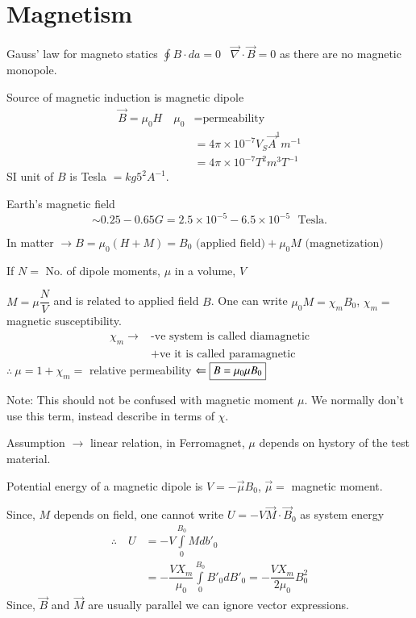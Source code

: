 \section*{Magnetism}

Gauss' law for magneto statics $\oint B\cdot da=0$ \ $\overrightarrow{\nabla}\cdot \overrightarrow{B}=0$ as there are no magnetic monopole.

Source of magnetic induction is magnetic dipole
\begin{align*}
\overrightarrow{B}=\mu_{0}H\quad \mu_{0} &= \text{permeability}\\
&= 4\pi \times 10^{-7}V_{S}\overrightarrow{A}^{1}m^{-1}\\
&= 4\pi \times 10^{-7}T^{2}m^{3}T^{-1}
\end{align*}
SI unit of $B$ is Tesla $=kg5^{2}A^{-1}$.

Earth's magnetic field
$$
\sim 0.25-0.65 G= 2.5\times 10^{-5}-6.5\times 10^{-5}\text{~ Tesla.}
$$

In matter $\to B=\mu_{0}(H+M)=B_{0}\text{ (applied field)} + \mu_{0}M\text{ (magnetization)}$

If $N=$ No. of dipole moments, $\mu$ in a volume, $V$ 

$M=\mu\dfrac{N}{V}$ and is related to applied field $B$. One can write $\mu_{0}M=\chi_{m}B_{0}$, $\chi_{m}=$ magnetic susceptibility.
\begin{align*}
\chi_{m} \to & \text{-ve system is called diamagnetic}\\
            & \text{+ve it is called paramagnetic}
\end{align*}
$\therefore \ \mu=1+\chi_{m}=$ relative permeability $\Leftarrow \fbox{$B=\mu_{0}\mu B_{0}$}$

Note: This should not be confused with magnetic moment $\mu$. We normally don't use this term, instead describe in terms of $\chi$.

Assumption $\to$ linear relation, in Ferromagnet, $\mu$ depends on hystory of the test material.

Potential energy of a magnetic dipole is $V=-\overrightarrow{\mu}B_{0}$, $\overrightarrow{\mu}=$ magnetic moment.

Since, $M$ depends on field, one cannot write $U=-V\overrightarrow{M}\cdot \overrightarrow{B}_{0}$ as system energy
\begin{align*}
\therefore\quad U &= -V\int\limits^{B_{0}}_{0}Mdb'_{0}\\
&= -\dfrac{VX_{m}}{\mu_{0}}\int\limits^{B_{0}}_{0}B'_{0}dB'_{0}=-\dfrac{VX_{m}}{2\mu_{0}}B^{2}_{0}
\end{align*}
Since, $\overrightarrow{B}$ and $\overrightarrow{M}$ are usually parallel we can ignore vector expressions.


